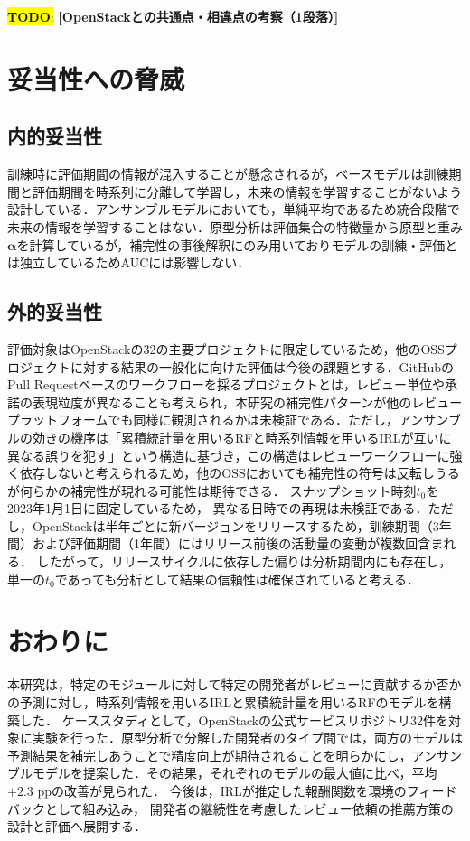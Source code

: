 \documentclass[submit,noauthor,ses,dvipdfmx]{ipsj}
\newcommand{\todo}[1]{\colorbox{yellow}{{\bf TODO}:}{\color{red} {\textbf{[#1]}}}}
\newcommand{\fixstart}{\color{magenta}}
\newcommand{\fixend}{\color{black}}
\begin{document}
\todo{OpenStackとの共通点・相違点の考察（1段落）}
\fixend

\section{妥当性への脅威}\label{sec:validity}

\subsection{内的妥当性}
訓練時に評価期間の情報が混入することが懸念されるが，ベースモデルは訓練期間と評価期間を時系列に分離して学習し，未来の情報を学習することがないよう設計している．アンサンブルモデルにおいても，\fixstart 単純平均であるため\fixend 統合段階で未来の情報を学習することはない．原型分析は評価集合の特徴量から原型と重み$\bm{\alpha}$を計算しているが，補完性の事後解釈にのみ用いておりモデルの訓練・評価とは独立しているためAUCには影響しない．

\subsection{外的妥当性}
評価対象はOpenStackの32の主要プロジェクトに限定しているため，他のOSSプロジェクトに対する結果の一般化に向けた評価は今後の課題とする．GitHubのPull Requestベースのワークフローを採るプロジェクトとは，レビュー単位や承諾の表現粒度が異なることも考えられ，本研究の補完性パターンが他のレビュープラットフォームでも同様に観測されるかは未検証である．\fixstart ただし，アンサンブルの効きの機序は「累積統計量を用いるRFと時系列情報を用いるIRLが互いに異なる誤りを犯す」という構造に基づき，この構造はレビューワークフローに強く依存しないと考えられるため，他のOSSにおいても補完性の符号は反転しうるが何らかの補完性が現れる可能性は期待できる．\fixend
スナップショット時刻$t_0$を2023年1月1日に固定しているため，
異なる日時での再現は未検証である．ただし，OpenStackは半年ごとに新バージョンをリリースするため，訓練期間（3年間）および評価期間（1年間）にはリリース前後の活動量の変動が複数回含まれる．
したがって，リリースサイクルに依存した偏りは分析期間内にも存在し，単一の$t_0$であっても分析として結果の信頼性は確保されていると考える．

\section{おわりに}\label{sec:conclusion}
本研究は，特定のモジュールに対して特定の開発者がレビューに貢献するか否かの予測に対し，時系列情報を用いるIRLと累積統計量を用いるRFのモデルを構築した．
ケーススタディとして，OpenStackの公式サービスリポジトリ32件を対象に実験を行った．原型分析で分解した開発者のタイプ間では，両方のモデルは予測結果を補完しあうことで精度向上が期待されることを明らかにし，アンサンブルモデルを提案した．その結果，それぞれのモデルの最大値に比べ，平均$+2.3$ ppの改善が見られた．
今後は，IRLが推定した報酬関数を環境のフィードバックとして組み込み，
開発者の継続性を考慮したレビュー依頼の推薦方策の設計と評価へ展開する．
\end{document}
